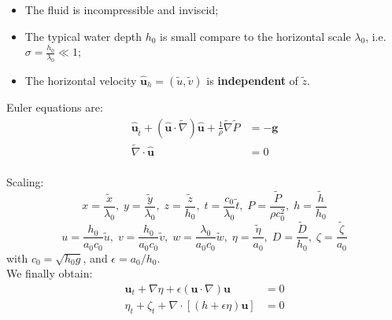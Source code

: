 \documentclass[compress,t]{beamer}
\begin{document}
  			\begin{frame}
  				\vfill
				\begin{itemize}
					\item The fluid is incompressible and inviscid;
					\item The typical water depth $h_0$ is small compare to the horizontal scale $\lambda_0$, i.e. $\sigma = \frac{h_0}{\lambda_0} \ll 1 $;
					\item The horizontal velocity $\hat{\mathbf{u}}_h = (\tilde u, \tilde v)$ is \textbf{independent} of $\tilde z$.
				\end{itemize}
				\vfill
				\pause
 				Euler equations are: 
				\begin{align*}
						\displaystyle \mathbf{\hat{u}}_{\tilde{t}} + (\mathbf{\hat{u}} \cdot \tilde{\nabla}) \mathbf{\hat{u}} + \frac{1}{\rho} \tilde{\nabla}\tilde{P} &=  -\mathbf{g}\\
						\tilde{\nabla} \cdot \mathbf{\hat{u}} & = 0 \\
				\end{align*}	
				\vfill	
			\end{frame}
			
  			\begin{frame}
  				Scaling: 
  				\begin{equation*}
					x = \frac{\tilde{x}}{\lambda_0},\; 
					y = \frac{\tilde{y}}{\lambda_0}, \;
					z = \frac{\tilde{z}}{h_0}, \; 
					t = \frac{c_0}{\lambda_0}\tilde{t},\;
					P = \dfrac{\tilde{P}}{\rho c_0^2},\;
					h = \dfrac{\tilde{h}}{h_0}	
				\end{equation*}
				\begin{equation*}
					u = \frac{h_0}{a_0 c_0} \tilde{u},\;
					v = \dfrac{h_0}{a_0 c_0} \tilde{v},\;
					w = \dfrac{\lambda_0}{a_0 c_0} \tilde{w},\; 
					\eta = \dfrac{\tilde{\eta}}{a_0},\;
					D = \dfrac{\tilde{D}}{h_0}, \;
					\zeta = \dfrac{\tilde{\zeta}}{a_0}			
				\end{equation*}
				with $c_0 = \sqrt{h_0 g}$, and $\epsilon = a_0/h_0$.\\ 
				\vfill		
				\pause
				We finally obtain: 
				\begin{align*}
					\mathbf{u}_t + \nabla\eta + \epsilon (\mathbf{u} \cdot \nabla) \mathbf{u} &= 0 \\
					\eta_t + \zeta_t + \nabla \cdot [(h+\epsilon \eta) \mathbf{u}] &= 0
				\end{align*}
				\vfill
			\end{frame}
			
\end{document}
